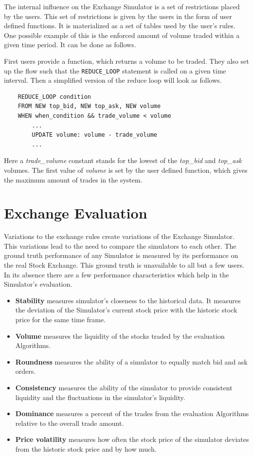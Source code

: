 \documentclass{article}
\begin{document}
The internal influence on the Exchange Simulator is a set of restrictions placed by the users. This set of restrictions is given by the users in the form of user defined functions. It is materialized as a set of tables used by the user's rules. One possible example of this is the enforced amount of volume traded within a given time period. It can be done as follows. 

First users provide a function, which returns a volume to be traded. They also set up the flow such that the {\tt REDUCE\_LOOP} statement is called on a given time interval. Then a simplified version of the reduce loop will look as follows.

\begin{verbatim}
    REDUCE_LOOP condition
    FROM NEW top_bid, NEW top_ask, NEW volume
    WHEN when_condition && trade_volume < volume
        ...
        UPDATE volume: volume - trade_volume
        ...
\end{verbatim}

Here a \emph{trade\_volume} constant stands for the lowest of the \emph{top\_bid} and \emph{top\_ask} volumes. The first value of \emph{volume} is set by the user defined function, which gives the maximum amount of trades in the system.

\section{Exchange Evaluation}

Variations to the exchange rules create variations of the Exchange Simulator. This variations lead to the need to compare the simulators to each other. The ground truth performance of any Simulator is measured by its performance on the real Stock Exchange. This ground truth is unavailable to all but a few users. In its absence there are a few performance characteristics which help in the Simulator's evaluation.

\begin{itemize}
    \item {\bf Stability} measures simulator's closeness to the historical data. It measures the deviation of the Simulator's current stock price with the historic stock price for the same time frame. 
    \item {\bf Volume} measures the liquidity of the stocks traded by the evaluation Algorithms. 
    \item {\bf Roundness} measures the ability of a simulator to equally match bid and ask orders. 
    \item {\bf Consistency} measures the ability of the simulator to provide consistent liquidity and the fluctuations in the simulator's liquidity. 
    \item {\bf Dominance} measures a percent of the trades from the evaluation Algorithms relative to the overall trade amount. 
    \item {\bf Price volatility} measures how often the stock price of the simulator deviates from the historic stock price and by how much.
\end{itemize}
\end{document}
